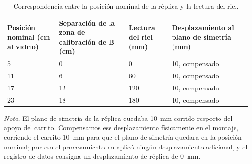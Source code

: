 
\begin{table}[htbp]
\centering\footnotesize
\caption{Correspondencia entre la posición nominal de la réplica y la lectura del riel.}
\label{tab:posiciones}
\begin{tabular}{@{}p{2.8cm}p{3.4cm}p{2.6cm}p{3.4cm}@{}}
\toprule
Posición nominal (cm al vidrio) & Separación de la zona de calibración de B (cm) & Lectura del riel (mm) & Desplazamiento al plano de simetría (mm) \\
\midrule
5  & 0  & 0   & 10, compensado \\
11 & 6  & 60  & 10, compensado \\
17 & 12 & 120 & 10, compensado \\
23 & 18 & 180 & 10, compensado \\
\bottomrule
\end{tabular}

\smallskip
\begin{minipage}{0.9\textwidth}\footnotesize
\emph{Nota.} El plano de simetría de la réplica quedaba 10~mm corrido respecto del apoyo del carrito. Compensamos ese desplazamiento físicamente en el montaje, corriendo el carrito 10~mm para que el plano de simetría quedara en la posición nominal; por eso el procesamiento no aplicó ningún desplazamiento adicional, y el registro de datos consigna un desplazamiento de réplica de 0~mm.
\end{minipage}
\end{table}
